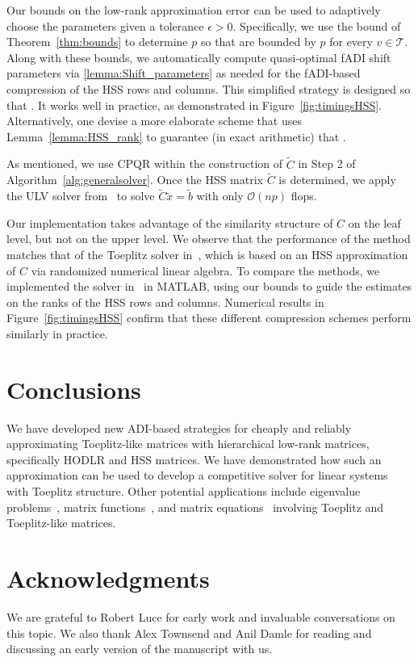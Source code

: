 \documentclass[final,reqno,onefignum,onetabnum]{siamart190516}
\newcommand{\erank}{{\rm rank}_\epsilon}
\begin{document}
Our bounds on the low-rank approximation error can be used to adaptively choose the parameters given a tolerance $\epsilon > 0$.  Specifically, we use the bound of Theorem~\ref{thm:bounds} to determine $p$ so that \smash{$\erank(C_v^{\mathrm{row}})$ and  $\erank(C_v^{\mathrm{col}})$} are bounded by $p$ for every $v \in \mathcal{T}$. Along with these bounds, we automatically compute quasi-optimal fADI shift parameters via \cref{lemma:Shift_parameters} as needed for the fADI-based compression of the HSS rows and columns. This simplified strategy is designed so that . It works well in practice, as demonstrated in Figure~\ref{fig:timingsHSS}.  Alternatively, one devise a more elaborate scheme that uses Lemma~\ref{lemma:HSS_rank} to guarantee (in exact arithmetic) that .  

As mentioned, we use CPQR within the construction of $\widetilde{C}$ in Step 2 of Algorithm~\ref{alg:generalsolver}.
Once the HSS matrix $\widetilde{C}$ is determined, we apply the ULV solver from~\cite{chandrasekaran2006fast} to solve $\widetilde{C}\widetilde{x} = \widetilde{b}$ with only $\mathcal{O}(n p)$ flops.

 Our implementation takes  advantage of the similarity structure of $C$ on the leaf level, but not on the upper level.
 We observe that the performance of the method  matches that of the  Toeplitz solver in~\cite{xia2012superfast}, which is based on an HSS approximation of $C$ via randomized numerical linear algebra. To compare the methods, we implemented the solver in~\cite{xia2012superfast} in MATLAB, using our bounds to guide the estimates on the ranks of the HSS rows and columns.  Numerical results in Figure~\ref{fig:timingsHSS} confirm that these different compression schemes perform similarly in practice.  
 
 
 
 \section{Conclusions}
 
 We have developed new ADI-based strategies for cheaply and reliably approximating Toeplitz-like matrices with hierarchical low-rank matrices, specifically HODLR and HSS matrices. We have demonstrated how such an approximation can be used to develop a competitive solver for linear systems with Toeplitz structure. Other potential applications include
 eigenvalue problems~\cite{Ou2022}, matrix functions~\cite{Casulli2024}, and matrix equations~\cite{KMR2019} involving Toeplitz and Toeplitz-like matrices.
 
 
 
\section*{Acknowledgments}

We are grateful to Robert Luce for early work and invaluable conversations on this topic. We also thank Alex Townsend and Anil Damle for reading and discussing an early version of the manuscript with us. 



\end{document}
